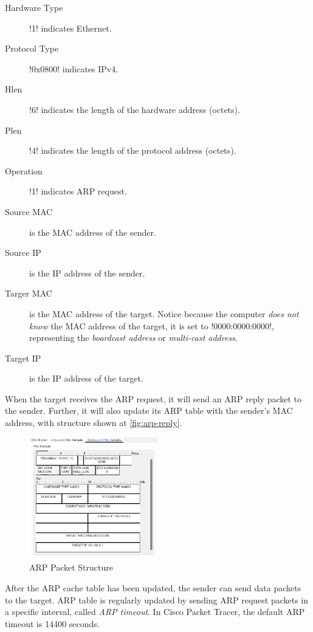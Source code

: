 \begin{description}
    \item[Hardware Type] \mono!1! indicates Ethernet.
    \item[Protocol Type] \mono!0x0800! indicates IPv4.
    \item[Hlen] \mono!6! indicates the length of the hardware address (octets).
    \item[Plen] \mono!4! indicates the length of the protocol address (octets).
    \item[Operation] \mono!1! indicates ARP request.
    \item[Source MAC] is the MAC address of the sender.
    \item[Source IP] is the IP address of the sender.
    \item[Targer MAC] is the MAC address of the target. Notice because the
        computer \emph{does not know} the MAC address of the target, it is set to
        \mono!0000:0000:0000!, representing the \emph{boardcast address} or
        \emph{multi-cast address}.
    \item[Target IP] is the IP address of the target.
\end{description}

When the target receives the ARP request, it will send an ARP reply packet to
the sender. Further, it will also update its ARP table with the sender's MAC
address, with structure shown at \autoref{fig:arp-reply}.

\begin{figure}[!htbp]
    \centering
    \includegraphics[width=0.5\textwidth]{images/arp-reply.png}
    \caption{ARP Packet Structure}\label{fig:arp-reply}
\end{figure}

After the ARP cache table has been updated, the sender can send data packets to
the target. ARP table is regularly updated by sending ARP request packets in a
specific interval, called \emph{ARP timeout}. In Cisco Packet Tracer, the
default ARP timeout is 14400 seconds.

